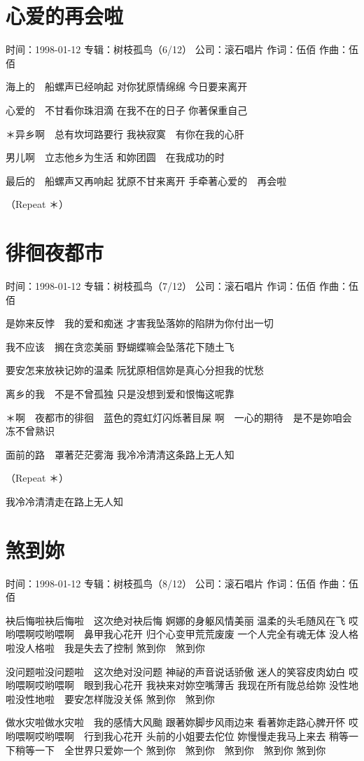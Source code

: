 \documentclass[UTF8,a4paper,oneside,twocolumn,12pt]{ctexbook}
\newcommand{\infopair}[2]{\textbullet #1：#2}
\newcommand{\zc}[1][伍佰]{\infopair{作词}{#1}}
\newcommand{\zq}[1][伍佰]{\infopair{作曲}{#1}}
\newcommand{\zj}[1]{\infopair{专辑}{#1}}
\newcommand{\sj}[1]{\infopair{时间}{#1}}
\newcommand{\gs}[1]{\infopair{公司}{#1}}
\newenvironment{info}{\begin{flushleft}\kaishu
	}
	{\end{flushleft}\normalsize\yahei\par}
\newenvironment{lyric}{
	}
{}
\begin{document}
\section{心爱的再会啦}
\begin{info}
	\sj{1998-01-12}
	\zj{树枝孤鸟（6/12）}
	\gs{滚石唱片}
	\zc
	\zq
\end{info}
\begin{lyric}
	海上的　船螺声已经响起
	对你犹原情绵绵
	今日要来离开

	心爱的　不甘看你珠泪滴
	在我不在的日子
	你著保重自己

	＊异乡啊　总有坎坷路要行
	我袂寂寞　有你在我的心肝

	男儿啊　立志他乡为生活
	和妳团圆　在我成功的时

	最后的　船螺声又再响起
	犹原不甘来离开
	手牵著心爱的　再会啦

	（Repeat ＊）
\end{lyric}

\section{徘徊夜都市}
\begin{info}
	\sj{1998-01-12}
	\zj{树枝孤鸟（7/12）}
	\gs{滚石唱片}
	\zc
	\zq
\end{info}
\begin{lyric}
	是妳来反悖　我的爱和痴迷
	才害我坠落妳的陷阱为你付出一切

	我不应该　搁在贪恋美丽
	野蝴蝶嘛会坠落花下随土飞

	要安怎来放袂记妳的温柔
	阮犹原相信妳是真心分担我的忧愁

	离乡的我　不是不曾孤独
	只是没想到爱和恨悔这呢靠

	＊啊　夜都市的徘徊　蓝色的霓虹灯闪烁著目屎
	啊　一心的期待　是不是妳咱会冻不曾熟识

	面前的路　罩著茫茫雾海
	我冷冷清清这条路上无人知

	（Repeat ＊）

	我冷冷清清走在路上无人知
\end{lyric}

\section{煞到妳}
\begin{info}
	\sj{1998-01-12}
	\zj{树枝孤鸟（8/12）}
	\gs{滚石唱片}
	\zc
	\zq
\end{info}
\begin{lyric}
	袂后悔啦袂后悔啦　这次绝对袂后悔
	婀娜的身躯风情美丽
	温柔的头毛随风在飞
	哎哟喂啊哎哟喂啊　鼻甲我心花开
	归个心变甲荒荒废废
	一个人完全有魂无体
	没人格啦没人格啦　我是失去了控制
	煞到你　煞到你

	没问题啦没问题啦　这次绝对没问题
	神祕的声音说话骄傲
	迷人的笑容皮肉幼白
	哎哟喂啊哎哟喂啊　眼到我心花开
	我袂来对妳空嘴薄舌
	我现在所有陇总给妳
	没性地啦没性地啦　要安怎样陇没关係
	煞到你　煞到你

	做水灾啦做水灾啦　我的感情大风颱
	跟著妳脚步风雨边来
	看著妳走路心脾开怀
	哎哟喂啊哎哟喂啊　行到我心花开
	头前的小姐要去佗位
	妳慢慢走我马上来去
	稍等一下稍等一下　全世界只爱妳一个
	煞到你　煞到你　煞到你　煞到你
	煞到你
\end{lyric}
\end{document}
